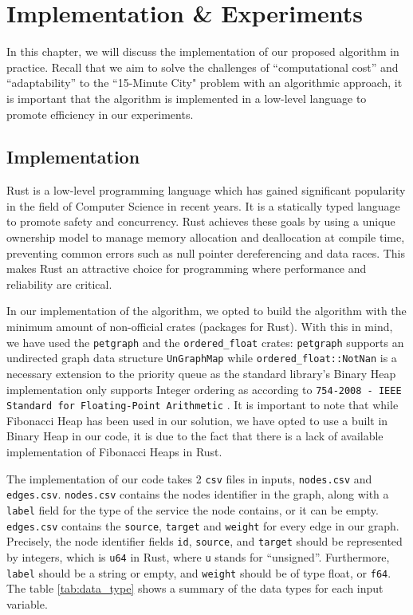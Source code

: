 \chapter{Implementation \& Experiments} \label{experiments}

In this chapter, we will discuss the implementation of our proposed algorithm in practice. Recall that we aim to solve the challenges of ``computational cost'' and ``adaptability'' \cite{lima_quest_2023} to the ``15-Minute City" problem with an algorithmic approach, it is important that the algorithm is implemented in a low-level language to promote efficiency in our experiments.

\section{Implementation}

Rust is a low-level programming language which has gained significant popularity in the field of Computer Science in recent years. It is a statically typed language to promote safety and concurrency. Rust achieves these goals by using a unique ownership model to manage memory allocation and deallocation at compile time, preventing common errors such as null pointer dereferencing and data races. This makes Rust an attractive choice for programming where performance and reliability are critical.

In our implementation of the algorithm, we opted to build the algorithm with the minimum amount of non-official crates (packages for Rust). With this in mind, we have used the \verb|petgraph| and the \verb|ordered_float| crates: \verb|petgraph| \cite{petgraph} supports an undirected graph data structure \verb|UnGraphMap| while \verb|ordered_float::NotNan| \cite{ordered_float} is a necessary extension to the priority queue as the standard library's Binary Heap implementation only supports Integer ordering as according to \verb|754-2008 - IEEE Standard for Floating-Point Arithmetic| \cite{IEEE}. It is important to note that while Fibonacci Heap has been used in our solution, we have opted to use a built in Binary Heap in our code, it is due to the fact that there is a lack of available implementation of Fibonacci Heaps in Rust.

The implementation of our code takes 2 \verb|csv| files in inputs, \verb|nodes.csv| and \verb|edges.csv|. \verb|nodes.csv| contains the nodes identifier in the graph, along with a \verb|label| field for the type of the service the node contains, or it can be empty. \verb|edges.csv| contains the \verb|source|, \verb|target| and \verb|weight| for every edge in our graph. Precisely, the node identifier fields \verb|id|, \verb|source|, and \verb|target| should be represented by integers, which is \verb|u64| in Rust, where \verb|u| stands for ``unsigned''. Furthermore, \verb|label| should be a string or empty, and \verb|weight| should be of type float, or \verb|f64|. The table \ref{tab:data_type} shows a summary of the data types for each input variable.

